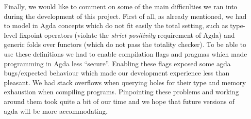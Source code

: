 \documentclass[a4paper]{article}
\begin{document}
        Finally, we would like to comment on some of the main difficulties we ran into during the
        development of this project. First of all, as already mentioned, we had to model in Agda concepts which
        do not fit easily the total setting, such as type-level fixpoint operators (violate the
        \emph{strict positivity} requirement of Agda) and generic folds over functors (which do not pass
        the totality checker). To be able to use these definitions we had to enable compilation flags and pragmas
        which made programming in Agda less ``secure''. Enabling these flags exposed some agda bugs/expected behaviour which made our 
        development experience less than pleasant. We had stack overflows when querying holes for their type and memory exhaustion when compiling
        programs. Pinpointing these problems and working around them took quite a bit of our time and we hope that future versions of agda will be
        more accommodating.


    
    
\end{document}
